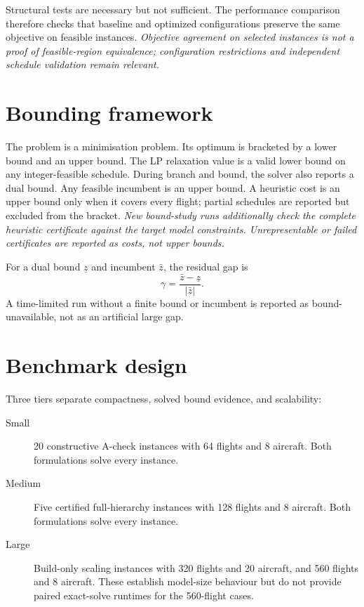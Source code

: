 Structural tests are necessary but not sufficient. The performance comparison
therefore checks that baseline and optimized configurations preserve the same
objective on feasible instances. \textit{Objective agreement on selected
instances is not a proof of feasible-region equivalence; configuration
restrictions and independent schedule validation remain relevant.}

\section{Bounding framework}

The problem is a minimisation problem. Its optimum is bracketed by a lower
bound and an upper bound. The LP relaxation value is a valid lower bound on any
integer-feasible schedule. During branch and bound, the solver also reports a
dual bound. Any feasible incumbent is an upper bound. A heuristic cost is an
upper bound only when it covers every flight; partial schedules are reported
but excluded from the bracket. \textit{New bound-study runs additionally check
the complete heuristic certificate against the target model constraints.
Unrepresentable or failed certificates are reported as costs, not upper bounds.}

For a dual bound $\underline{z}$ and incumbent $\bar z$, the residual gap is
\begin{equation}
    \gamma = \frac{\bar z-\underline{z}}{|\bar z|}.
    \label{eq:strength_gap}
\end{equation}
A time-limited run without a finite bound or incumbent is reported as
bound-unavailable, not as an artificial large gap.

\section{Benchmark design}

Three tiers separate compactness, solved bound evidence, and scalability:
\begin{description}
    \item[Small] 20 constructive A-check instances with 64 flights and 8
    aircraft. Both formulations solve every instance.
    \item[Medium] Five certified full-hierarchy instances with 128 flights and
    8 aircraft. Both formulations solve every instance.
    \item[Large] Build-only scaling instances with 320 flights and 20 aircraft,
    and 560 flights and 8 aircraft. These establish model-size behaviour but do
    not provide paired exact-solve runtimes for the 560-flight cases.
\end{description}

